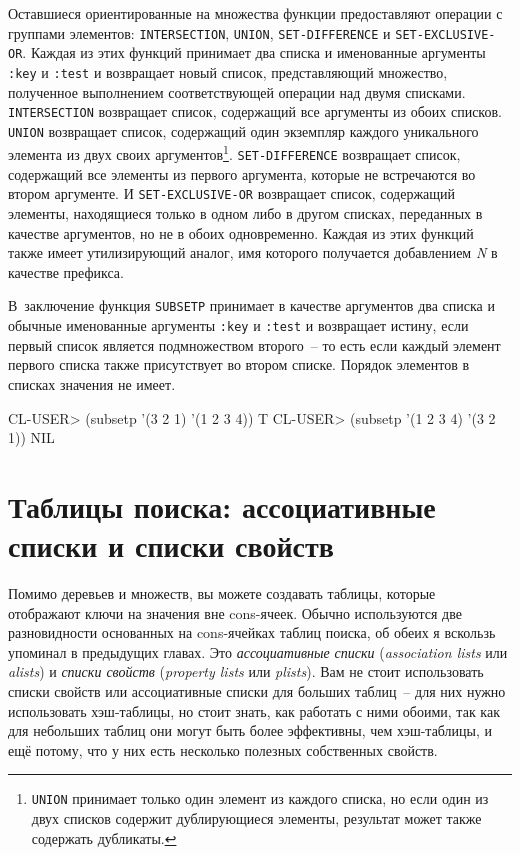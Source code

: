 Оставшиеся ориентированные на множества функции предоставляют операции с группами
элементов: \lstinline{INTERSECTION}, \lstinline{UNION}, \lstinline{SET-DIFFERENCE} и
\lstinline{SET-EXCLUSIVE-OR}.  Каждая из этих функций принимает два списка и именованные
аргументы \lstinline{:key} и \lstinline{:test} и возвращает новый список, представляющий множество,
полученное выполнением соответствующей операции над двумя списками. \lstinline{INTERSECTION}
возвращает список, содержащий все аргументы из обоих списков. \lstinline{UNION} возвращает
список, содержащий один экземпляр каждого уникального элемента из двух своих
аргументов\footnote{\lstinline{UNION} принимает только один элемент из каждого списка, но если
  один из двух списков содержит дублирующиеся элементы, результат может также содержать
  дубликаты.}\hspace{\footnotenegspace}. \lstinline{SET-DIFFERENCE} возвращает список, содержащий все элементы из первого
аргумента, которые не встречаются во втором аргументе. И \lstinline{SET-EXCLUSIVE-OR}
возвращает список, содержащий элементы, находящиеся только в одном либо в другом списках,
переданных в качестве аргументов, но не в обоих одновременно. Каждая из этих функций также
имеет утилизирующий аналог, имя которого получается добавлением \textit{N} в качестве
префикса.

В~заключение функция \lstinline{SUBSETP} принимает в качестве аргументов два списка и обычные
именованные аргументы \lstinline{:key} и \lstinline{:test} и возвращает истину, если первый список
является подмножеством второго~-- то есть если каждый элемент первого списка также
присутствует во втором списке.  Порядок элементов в списках значения не имеет.

\begin{myverb}
CL-USER> (subsetp '(3 2 1) '(1 2 3 4))
T
CL-USER> (subsetp '(1 2 3 4) '(3 2 1))
NIL
\end{myverb}


\section{Таблицы поиска: ассоциативные списки и списки свойств}

Помимо деревьев и множеств, вы можете создавать таблицы, которые отображают ключи на
значения вне cons-ячеек. Обычно используются две разновидности основанных на cons-ячейках
таблиц поиска, об обеих я вскользь упоминал в предыдущих главах. Это \textit{ассоциативные
  списки} (\textit{association lists} или \textit{alists}) и \textit{списки свойств}
(\textit{property lists} или \textit{plists}). Вам не стоит использовать списки свойств
или ассоциативные списки для больших таблиц~-- для них нужно использовать хэш-таблицы, но
стоит знать, как работать с ними обоими, так как для небольших таблиц они могут быть более
эффективны, чем хэш-таблицы, и ещё потому, что у них есть несколько полезных собственных
свойств.
 
